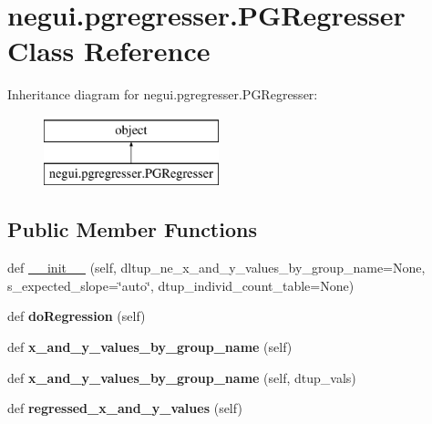 \hypertarget{classnegui_1_1pgregresser_1_1PGRegresser}{}\section{negui.\+pgregresser.\+P\+G\+Regresser Class Reference}
\label{classnegui_1_1pgregresser_1_1PGRegresser}
Inheritance diagram for negui.\+pgregresser.\+P\+G\+Regresser\+:\begin{figure}[H]
\begin{center}
\leavevmode
\includegraphics[height=2.000000cm]{classnegui_1_1pgregresser_1_1PGRegresser}
\end{center}
\end{figure}
\subsection*{Public Member Functions}
\begin{DoxyCompactItemize}
\item 
def \hyperlink{classnegui_1_1pgregresser_1_1PGRegresser_a4878463d2b941c7a5856ac9f64ac4789}{\+\_\+\+\_\+init\+\_\+\+\_\+} (self, dltup\+\_\+ne\+\_\+x\+\_\+and\+\_\+y\+\_\+values\+\_\+by\+\_\+group\+\_\+name=None, s\+\_\+expected\+\_\+slope=\char`\"{}auto\char`\"{}, dtup\+\_\+individ\+\_\+count\+\_\+table=None)
\item 
def {\bfseries do\+Regression} (self)\hypertarget{classnegui_1_1pgregresser_1_1PGRegresser_a6fa98c7372c6595a4cd7defb9f63c6ac}{}\label{classnegui_1_1pgregresser_1_1PGRegresser_a6fa98c7372c6595a4cd7defb9f63c6ac}

\item 
def {\bfseries x\+\_\+and\+\_\+y\+\_\+values\+\_\+by\+\_\+group\+\_\+name} (self)\hypertarget{classnegui_1_1pgregresser_1_1PGRegresser_a1943e9a386ad31fb4d8595d87664e18f}{}\label{classnegui_1_1pgregresser_1_1PGRegresser_a1943e9a386ad31fb4d8595d87664e18f}

\item 
def {\bfseries x\+\_\+and\+\_\+y\+\_\+values\+\_\+by\+\_\+group\+\_\+name} (self, dtup\+\_\+vals)\hypertarget{classnegui_1_1pgregresser_1_1PGRegresser_afa2381e02b16ab3ce0e35026f56f342c}{}\label{classnegui_1_1pgregresser_1_1PGRegresser_afa2381e02b16ab3ce0e35026f56f342c}

\item 
def {\bfseries regressed\+\_\+x\+\_\+and\+\_\+y\+\_\+values} (self)\hypertarget{classnegui_1_1pgregresser_1_1PGRegresser_acd9d0d25f055c97ee784000005e62827}{}\label{classnegui_1_1pgregresser_1_1PGRegresser_acd9d0d25f055c97ee784000005e62827}

\end{DoxyCompactItemize}


